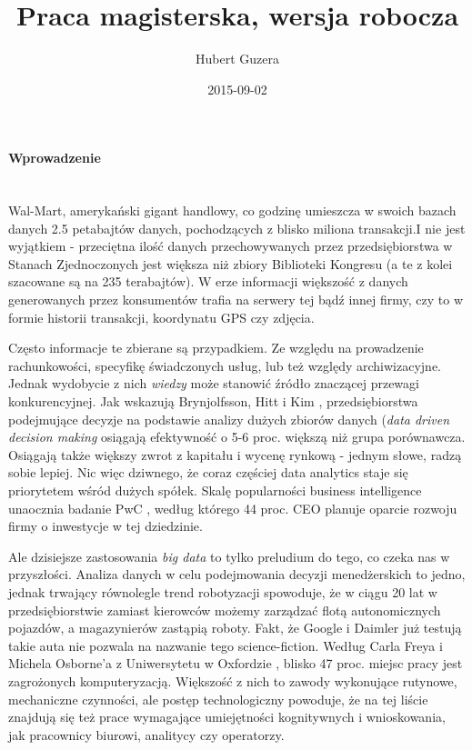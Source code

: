 \documentclass{article}
\title{Praca magisterska, wersja robocza}
\date{2015-09-02}
\author{Hubert Guzera}
\begin{document}
\maketitle
{}


\paragraph{Wprowadzenie} \mbox{}\\

Wal-Mart, amerykański gigant handlowy, co godzinę umieszcza w swoich bazach danych 2.5 petabajtów danych, pochodzących z blisko miliona transakcji.I nie jest wyjątkiem - przeciętna ilość danych przechowywanych przez przedsiębiorstwa w Stanach Zjednoczonych jest większa niż zbiory Biblioteki Kongresu (a te z kolei szacowane są na 235 terabajtów). W erze informacji większość z danych generowanych przez konsumentów trafia na serwery tej bądź innej firmy, czy to w formie historii transakcji, koordynatu GPS czy zdjęcia. 

Często informacje te zbierane są przypadkiem. Ze względu na prowadzenie rachunkowości, specyfikę świadczonych usług, lub też względy archiwizacyjne. Jednak wydobycie z nich \textit{wiedzy} może stanowić źródło znaczącej przewagi konkurencyjnej.  Jak wskazują Brynjolfsson, Hitt i Kim \cite{Brynjolfsson2011}, przedsiębiorstwa podejmujące decyzje na podstawie analizy dużych zbiorów danych (\textit{data driven decision making} osiągają efektywność o 5-6 proc. większą niż grupa porównawcza. Osiągają także większy zwrot z kapitału i wycenę rynkową - jednym słowe, radzą sobie lepiej. Nic więc dziwnego, że coraz częściej data analytics staje się priorytetem wśród dużych spółek. Skalę popularności business intelligence unaocznia badanie PwC \cite{PwC2014}, według którego 44 proc. CEO planuje oparcie rozwoju firmy o inwestycje w tej dziedzinie. 

Ale dzisiejsze zastosowania \textit{big data} to tylko preludium do tego, co czeka nas w przyszłości. Analiza danych w celu podejmowania decyzji menedżerskich to jedno, jednak trwający równolegle trend robotyzacji spowoduje, że w ciągu 20 lat w przedsiębiorstwie zamiast kierowców możemy zarządzać flotą autonomicznych pojazdów, a magazynierów zastąpią roboty. Fakt, że Google i Daimler już testują takie auta nie pozwala na nazwanie tego science-fiction. Według Carla Freya i Michela Osborne'a z Uniwersytetu w Oxfordzie \cite{Frey2013}, blisko 47 proc. miejsc pracy jest zagrożonych komputeryzacją. Większość z nich to zawody wykonujące rutynowe, mechaniczne czynności, ale postęp technologiczny powoduje, że na tej liście znajdują się też prace wymagające umiejętności kognitywnych i wnioskowania, jak pracownicy biurowi, analitycy czy operatorzy. 
\end{document}
